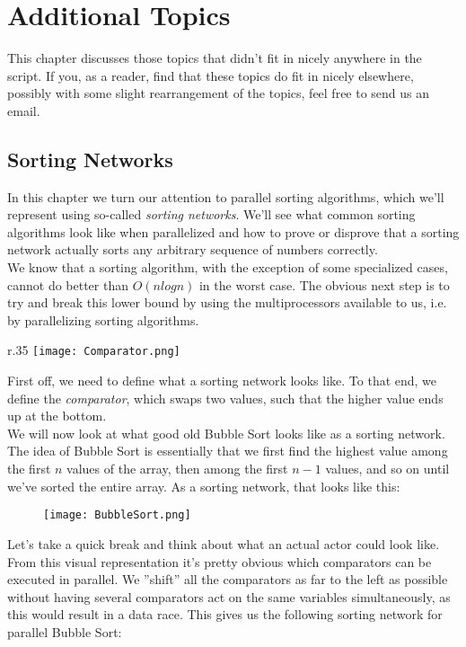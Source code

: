 \documentclass[main]{subfiles}
\begin{document}
\section{Additional Topics}
This chapter discusses those topics that didn't fit in nicely anywhere in the script. If you, as a reader, find that these topics do fit in nicely elsewhere, possibly with some slight rearrangement of the topics, feel free to send us an email.
\subsection{Sorting Networks}
In this chapter we turn our attention to parallel sorting algorithms, which we'll represent using so-called \textit{sorting networks}. We'll see what common sorting algorithms look like when parallelized and how to prove or disprove that a sorting network actually sorts any arbitrary sequence of numbers correctly.\\[3mm]
We know that a sorting algorithm, with the exception of some specialized cases, cannot do better than $O(nlogn)$ in the worst case. The obvious next step is to try and break this lower bound by using the multiprocessors available to us, i.e. by parallelizing sorting algorithms.\\[3mm]
\begin{wrapfigure}{r}{.35\textwidth}
    \centering
    \vspace{-15pt}
    \texttt{[image: Comparator.png]}
\end{wrapfigure}
First off, we need to define what a sorting network looks like. To that end, we define the \textit{comparator}, which swaps two values, such that the higher value ends up at the bottom.\\[3mm]
We will now look at what good old Bubble Sort looks like as a sorting network. The idea of Bubble Sort is essentially that we first find the highest value among the first $n$ values of the array, then among the first $n-1$ values, and so on until we've sorted the entire array. As a sorting network, that looks like this:
\begin{figure}[H]
    \centering
    \texttt{[image: BubbleSort.png]}
\end{figure}Let’s take a quick break and think about what an actual actor could look like.
\noindent From this visual representation it's pretty obvious which comparators can be executed in parallel. We ''shift'' all the comparators as far to the left as possible without having several comparators act on the same variables simultaneously, as this would result in a data race. This gives us the following sorting network for parallel Bubble Sort:
\end{document}
